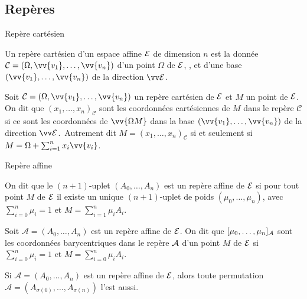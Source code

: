 \documentclass{m53beamer}
\begin{document}
\subsection{Repères}
  \begin{frame}{Repère cartésien}
    \begin{definition}
      Un \alert{repère cartésien} d'un espace affine $\mathcal{E}$ de dimension $n$ est la donnée $\mathcal{C}=(\Omega, \vv{v_{1}}, \ldots,\vv{v_{n}})$ d'un point $\Omega$ de $\mathcal{E}$, , et d'une base $(\vv{v_{1}}, \ldots,\vv{v_{n}})$ de la direction $\ev{E}$.
    \end{definition}\pause
    \begin{definition}
      Soit $\mathcal{C}=(\Omega, \vv{v_{1}}, \ldots,\vv{v_{n}})$ un repère cartésien de $\mathcal{E}$ et $M$ un point de $\mathcal{E}$. On dit que $(x_{1},\ldots,x_{n})_{\mathcal{C}}$ sont les \alert{coordonnées cartésiennes} de $M$ dans le repère $\mathcal{C}$ si ce sont les coordonnées de $\vv{\Omega M}$ dans la base $(\vv{v_{1}}, \ldots,\vv{v_{n}})$ de la direction $\ev{E}$.\pause\ Autrement dit $M=(x_{1},\ldots,x_{n})_{\mathcal{C}}$ si et seulement si $M=\Omega+\sum_{i=1}^{n}x_{i}\vv{v_{i}}$.
    \end{definition}
  \end{frame}
  \begin{frame}{Repère affine}
    \begin{definition}
      On dit que le $(n+1)$-uplet $(A_{0},\ldots,A_{n})$ est un \alert{repère affine} de $\mathcal{E}$ si pour tout point $M$ de $\mathcal{E}$ il existe un unique $(n+1)$-uplet de poids $(\mu_{0},\ldots,\mu_{n})$, avec $\sum_{i=0}^{n}\mu_{i}=1$ et $M=\sum_{i=1}^{n}\mu_{i}A_{i}$.
    \end{definition}\pause
    \begin{definition}
      Soit $\mathcal{A}=(A_{0},\ldots,A_{n})$ est un repère affine de $\mathcal{E}$. On dit que $[\mu_{0},\ldots,\mu_{n}]_{\mathcal{A}}$ sont les \alert{coordonnées barycentriques} dans le repère $\mathcal{A}$ d'un point $M$ de $\mathcal{E}$ si $\sum_{i=0}^{n}\mu_{i}=1$ et $M=\sum_{i=0}^{n}\mu_{i}A_{i}$.
    \end{definition}\pause
    \begin{remarque}
      Si $\mathcal{A}=(A_{0},\ldots,A_{n})$ est un repère affine de $\mathcal{E}$, alors toute permutation $\mathcal{A}=(A_{\sigma(0)},\ldots,A_{\sigma(n)})$ l'est aussi.
    \end{remarque}
  \end{frame}
\end{document}
